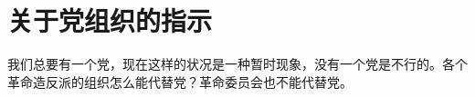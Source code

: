 \section[关于党组织的指示（一九六七年三月）]{关于党组织的指示}


我们总要有一个党，现在这样的状况是一种暂时现象，没有一个党是不行的。各个革命造反派的组织怎么能代替党？革命委员会也不能代替党。


